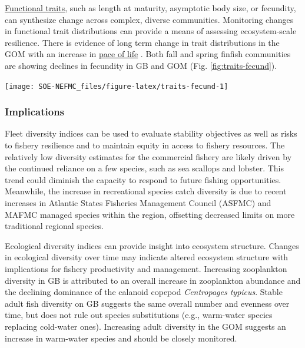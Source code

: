 \documentclass[
  10pt,
]{article}
\let\origfigure\figure
\let\endorigfigure\endfigure
\renewenvironment{figure}[1][2] {
    \expandafter\origfigure\expandafter[H]
} {
    \endorigfigure
}
\begin{document}
\href{https://noaa-edab.github.io/catalog/finfish_traits.html}{Functional traits}, such as length at maturity, asymptotic body size, or fecundity, can synthesize change across complex, diverse communities. Monitoring changes in functional trait distributions can provide a means of assessing ecosystem-scale resilience. There is evidence of long term change in trait distributions in the GOM with an increase in \href{https://noaa-edab.github.io/catalog/finfish_traits.html}{pace of life} . Both fall and spring finfish communities are showing declines in fecundity in GB and GOM (Fig. \ref{fig:traits-fecund}).

\begin{figure}

{\centering \texttt{[image: SOE-NEFMC\_files/figure-latex/traits-fecund-1]} 

}

\caption{Fish community functional traits in the Mid Atlantic Bight based on Fall (red) and Spring (blue) survey data. Length at maturity for the full finfish community has increased in spring (orange line), but decreased in fall (purple lines)}\label{fig:traits-fecund}
\end{figure}

\hypertarget{implications-3}{%
\subsubsection{Implications}\label{implications-3}}

Fleet diversity indices can be used to evaluate stability objectives as well as risks to fishery resilience and to maintain equity in access to fishery resources. The relatively low diversity estimates for the commercial fishery are likely driven by the continued reliance on a few species, such as sea scallops and lobster. This trend could diminish the capacity to respond to future fishing opportunities. Meanwhile, the increase in recreational species catch diversity is due to recent increases in Atlantic States Fisheries Management Council (ASFMC) and MAFMC managed species within the region, offsetting decreased limits on more traditional regional species.

Ecological diversity indices can provide insight into ecosystem structure. Changes in ecological diversity over time may indicate altered ecosystem structure with implications for fishery productivity and management. Increasing zooplankton diversity in GB is attributed to an overall increase in zooplankton abundance and the declining dominance of the calanoid copepod \emph{Centropages typicus}. Stable adult fish diversity on GB suggests the same overall number and evenness over time, but does not rule out species substitutions (e.g., warm-water species replacing cold-water ones). Increasing adult diversity in the GOM suggests an increase in warm-water species and should be closely monitored.
\end{document}
